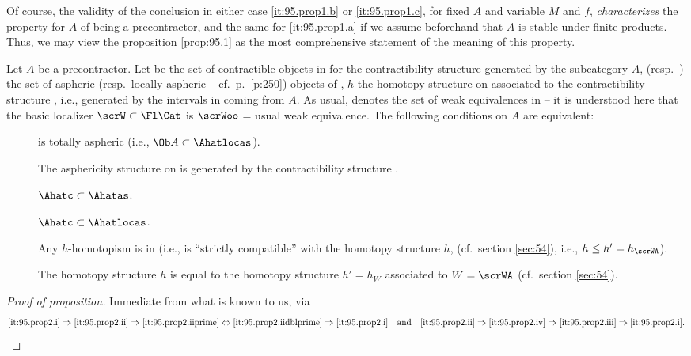 Of course, the validity of the conclusion in either case
\ref{it:95.prop1.b} or \ref{it:95.prop1.c}, for fixed $A$ and variable
$M$ and $f$, \emph{characterizes} the property for $A$ of being a
precontractor, and the same for \ref{it:95.prop1.a} if we assume
beforehand that $A$ is stable under finite products. Thus, we may view
the proposition \ref{prop:95.1} as the most comprehensive statement of
the meaning of this property.
\begin{propositionnum}\label{prop:95.2}
  Let $A$ be a precontractor. Let \Ahatc{} be the set of contractible
  objects in \Ahat{} for the contractibility structure generated by
  the subcategory $A$\kern1pt, \Ahatas{} \textup(resp.\ \Ahatlocas\textup) the
  set of aspheric \textup(resp.\ locally aspheric -- cf.\ p.\
  \ref{p:250}\textup) objects of \Ahat, $h$ the homotopy structure on
  \Ahat{} associated to the contractibility structure \Ahatc, i.e.,
  generated by the intervals in \Ahat{} coming from $A$\kern1pt. As usual,
  \scrWA{} denotes the set of weak equivalences in \Ahat{} -- it is
  understood here that the basic localizer $\scrW\subset\Fl\Cat$ is
  $\scrWoo$ = usual weak equivalence. The following conditions on $A$
  are equivalent:
  \begin{description}
  \item[]
    \Ahat{} is totally aspheric \textup(i.e., $\Ob A\subset\Ahatlocas$\textup).
  \item[\namedlabel{it:95.prop2.ii}{(ii)}]
    The asphericity structure \Ahatas{} on \Ahat{} is generated by the
    contractibility structure \Ahatc.
  \item[]
    $\Ahatc\subset\Ahatas$.
  \item[]
    $\Ahatc\subset\Ahatlocas$.
  \item[]
    Any $h$-homotopism is in \scrWA{} \textup(i.e., \scrWA{} is
    ``strictly compatible'' with the homotopy structure $h$,
    \textup(cf.\ section \ref{sec:54}\textup), i.e., $h\le
    h'=h_{\scrWA}$\textup).
  \item[]
    The homotopy structure $h$ is equal to the homotopy structure
    $h'=h_W$ associated to $W=\scrWA$ \textup(cf.\ section
    \ref{sec:54}\textup). 
  \end{description}
\end{propositionnum}
\begin{proof}[Proof of proposition]
  Immediate from what is known to us, via
  \[\text{\ref{it:95.prop2.i}} \Rightarrow
  \text{\ref{it:95.prop2.ii}} \Rightarrow
  \text{\ref{it:95.prop2.iiprime}} \Leftrightarrow
  \text{\ref{it:95.prop2.iidblprime}} \Rightarrow
  \text{\ref{it:95.prop2.i}}
  \quad\text{and}\quad
  \text{\ref{it:95.prop2.ii}} \Rightarrow
  \text{\ref{it:95.prop2.iv}} \Rightarrow
  \text{\ref{it:95.prop2.iii}} \Rightarrow
  \text{\ref{it:95.prop2.i}.}\]
\end{proof}
